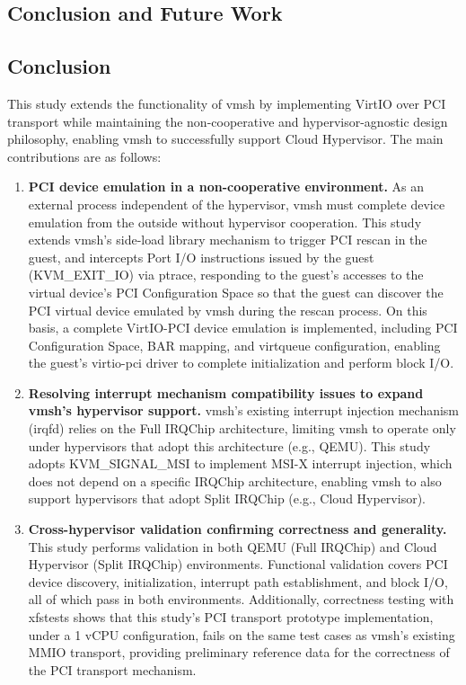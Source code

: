\begin{ZhChapter}

\chapter{Conclusion and Future Work}
\label{ch:conclusion}

\section{Conclusion}
\label{sec:conclusion}

This study extends the functionality of vmsh by implementing VirtIO over PCI transport while maintaining the non-cooperative and hypervisor-agnostic design philosophy, enabling vmsh to successfully support Cloud Hypervisor. The main contributions are as follows:

\begin{enumerate}
    \item \textbf{PCI device emulation in a non-cooperative environment.} As an external process independent of the hypervisor, vmsh must complete device emulation from the outside without hypervisor cooperation. This study extends vmsh's side-load library mechanism to trigger PCI rescan in the guest, and intercepts Port I/O instructions issued by the guest (KVM\_EXIT\_IO) via ptrace, responding to the guest's accesses to the virtual device's PCI Configuration Space so that the guest can discover the PCI virtual device emulated by vmsh during the rescan process. On this basis, a complete VirtIO-PCI device emulation is implemented, including PCI Configuration Space, BAR mapping, and virtqueue configuration, enabling the guest's virtio-pci driver to complete initialization and perform block I/O.

    \item \textbf{Resolving interrupt mechanism compatibility issues to expand vmsh's hypervisor support.} vmsh's existing interrupt injection mechanism (irqfd) relies on the Full IRQChip architecture, limiting vmsh to operate only under hypervisors that adopt this architecture (e.g., QEMU). This study adopts KVM\_SIGNAL\_MSI to implement MSI-X interrupt injection, which does not depend on a specific IRQChip architecture, enabling vmsh to also support hypervisors that adopt Split IRQChip (e.g., Cloud Hypervisor).

    \item \textbf{Cross-hypervisor validation confirming correctness and generality.} This study performs validation in both QEMU (Full IRQChip) and Cloud Hypervisor (Split IRQChip) environments. Functional validation covers PCI device discovery, initialization, interrupt path establishment, and block I/O, all of which pass in both environments. Additionally, correctness testing with xfstests shows that this study's PCI transport prototype implementation, under a 1 vCPU configuration, fails on the same test cases as vmsh's existing MMIO transport, providing preliminary reference data for the correctness of the PCI transport mechanism.
\end{enumerate}


\end{ZhChapter}
